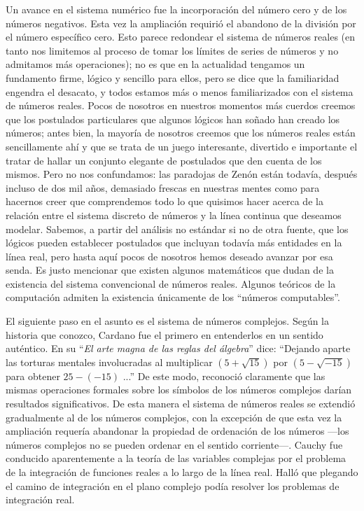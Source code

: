 \documentclass[a4paper, 12pt]{article}
\begin{document}
 

Un avance en el sistema numérico fue la incorporación del número cero y de los números negativos. Esta vez la ampliación requirió el abandono de la división por el número específico cero. Esto parece redondear el sistema de números reales (en tanto nos limitemos al proceso de tomar los límites de series de números y no admitamos más operaciones); no es que en la actualidad tengamos un fundamento firme, lógico y sencillo para ellos, pero se dice que la familiaridad engendra el desacato, y todos estamos más o menos familiarizados con el sistema de números reales. Pocos de nosotros en nuestros momentos más cuerdos creemos que los postulados particulares que algunos lógicos han soñado han creado los números; antes bien, la mayoría de nosotros creemos que los números reales están sencillamente ahí y que se  trata de un juego interesante, divertido e importante el tratar de hallar un conjunto elegante de postulados que den cuenta de los mismos. Pero no nos confundamos: las paradojas de Zenón están todavía, después incluso de dos mil años, demasiado frescas en nuestras mentes como para hacernos creer que comprendemos todo lo que quisimos hacer acerca de la relación entre el sistema discreto de números y la línea continua que deseamos modelar. Sabemos, a partir del análisis no estándar si no de otra fuente, que los lógicos pueden establecer postulados que incluyan todavía más entidades en la línea real, pero hasta aquí pocos de nosotros hemos deseado avanzar por esa senda. Es justo mencionar que existen algunos matemáticos que dudan de la existencia del sistema convencional de números reales. Algunos teóricos de la computación admiten la existencia únicamente de los ``números computables''.

 

El siguiente paso en el asunto es el sistema de números complejos. Según la historia que conozco, Cardano fue el primero en entenderlos en un sentido auténtico. En su ``{\it El arte magna de las reglas del álgebra}''  dice: ``Dejando aparte las torturas mentales involucradas al multiplicar $(5 + \sqrt{15})$ por $(5 - \sqrt{ -15})$ para obtener $25-(-15)$ ...'' De este modo, reconoció claramente que las mismas operaciones formales sobre los símbolos de los números complejos darían resultados significativos. De esta manera el sistema de números reales se extendió gradualmente al de los números complejos, con la excepción de que esta vez la ampliación requería abandonar la propiedad de ordenación de los números ---los números complejos no se pueden ordenar en el sentido corriente---. Cauchy fue conducido aparentemente a la teoría de las variables complejas por el problema de la integración de funciones reales a lo largo de la línea real. Halló que plegando el camino de integración en el plano complejo podía resolver los problemas de integración real.
\end{document}
